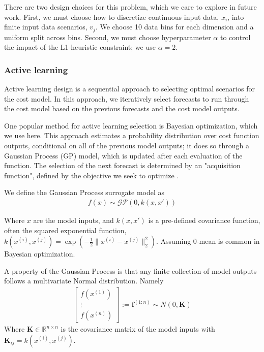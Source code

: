 \documentclass[10pt,twocolumn,letterpaper]{article}
\begin{document}
There are two design choices for this problem, which we care to explore in future work. First, we must choose how to discretize continuous input data, $x_i$, into finite input data scenarios, $v_j$. We choose 10 data bins for each dimension and a uniform split across bins. Second, we must choose hyperparameter $\alpha$ to control the impact of the L1-heuristic constraint; we use $\alpha=2$. 

\subsubsection{Active learning}
Active learning design is a sequential approach to selecting optimal scenarios for the cost model. In this approach, we iteratively select forecasts to run through the cost model based on the previous forecasts and the cost model outputs.

One popular method for active learning selection is Bayesian optimization, which we use here. This approach estimates a probability distribution over cost function outputs, conditional on all of the previous model outputs; it does so through a Gaussian Process (GP) model, which is updated after each evaluation of the function. The selection of the next forecast is determined by an "acquisition function", defined by the objective we seek to optimize \cite{brochu2010tutorial} \cite{wang2022intuitive}. 

We define the Gaussian Process surrogate model as
\begin{align*}
    f(x) \sim \mathcal{GP}(0, k(x, x'))
\end{align*}

Where $x$ are the model inputs, and $k(x, x')$ is a pre-defined covariance function, often the squared exponential function, $k(x^{(i)}, x^{(j)}) = \exp\left(-\frac{1}{2}\lVert x^{(i)} - x^{(j)}\rVert^2_2\right)$. Assuming 0-mean is common in Bayesian optimization.

A property of the Gaussian Process is that any finite collection of model outputs follows a multivariate Normal distribution. Namely
\begin{align*}
    \begin{bmatrix}
        f(x^{(1)})\\\vdots\\f(x^{(n)})
    \end{bmatrix} := \textbf{f}^{(1:n)} \sim N(0, \textbf{K})
\end{align*}
Where $\textbf{K}\in \mathbb{R}^{n\times n}$ is the covariance matrix of the model inputs with $\textbf{K}_{ij} = k(x^{(i)}, x^{(j)})$.
\end{document}
